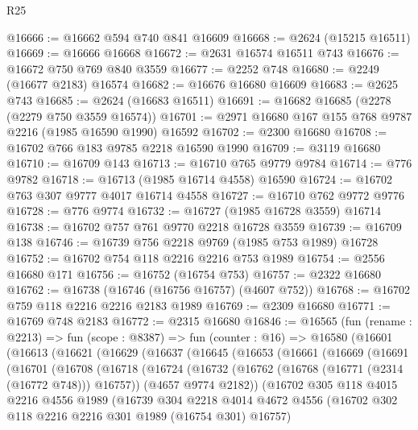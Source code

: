 \begin{lexlean}{R25}
\begin{coremodule}
@16666 := @16662 @594 @740 @841 @16609
@16668 := @2624 (@15215 @16511)
@16669 := @16666 @16668
@16672 := @2631 @16574 @16511 @743
@16676 := @16672 @750 @769 @840 @3559
@16677 := @2252 @748
@16680 := @2249 (@16677 @2183) @16574
@16682 := @16676 @16680 @16609
@16683 := @2625 @743
@16685 := @2624 (@16683 @16511)
@16691 := @16682 @16685 (@2278 (@2279 @750 @3559 @16574))
@16701 := @2971 @16680 @167 @155 @768 @9787 @2216 (@1985 @16590 @1990) @16592
@16702 := @2300 @16680
@16708 := @16702 @766 @183 @9785 @2218 @16590 @1990
@16709 := @3119 @16680
@16710 := @16709 @143
@16713 := @16710 @765 @9779 @9784
@16714 := @776 @9782
@16718 := @16713 (@1985 @16714 @4558) @16590
@16724 := @16702 @763 @307 @9777 @4017 @16714 @4558
@16727 := @16710 @762 @9772 @9776
@16728 := @776 @9774
@16732 := @16727 (@1985 @16728 @3559) @16714
@16738 := @16702 @757 @761 @9770 @2218 @16728 @3559
@16739 := @16709 @138
@16746 := @16739 @756 @2218 @9769 (@1985 @753 @1989) @16728
@16752 := @16702 @754 @118 @2216 @2216 @753 @1989
@16754 := @2556 @16680 @171
@16756 := @16752 (@16754 @753)
@16757 := @2322 @16680
@16762 := @16738 (@16746 (@16756 @16757) (@4607 @752))
@16768 := @16702 @759 @118 @2216 @2216 @2183 @1989
@16769 := @2309 @16680
@16771 := @16769 @748 @2183
@16772 := @2315 @16680
@16846 := @16565
    (fun (rename : @2213) =>
    fun (scope : @8387) =>
    fun (counter : @16) =>
    @16580
      (@16601
        (@16613
          (@16621
            (@16629
              (@16637
                (@16645
                  (@16653
                    (@16661
                      (@16669
                        (@16691
                          (@16701
                            (@16708
                              (@16718
                                (@16724
                                  (@16732
                                    (@16762 (@16768 (@16771 (@2314 (@16772 @748))) @16757))
                                    (@4657 @9774 @2182))
                                  (@16702
                                    @305
                                    @118
                                    @4015
                                    @2216
                                    @4556
                                    @1989
                                    (@16739
                                      @304
                                      @2218
                                      @4014
                                      @4672
                                      @4556
                                      (@16702 @302 @118 @2216 @2216 @301 @1989 (@16754 @301) @16757)

\end{coremodule}
\end{lexlean}
